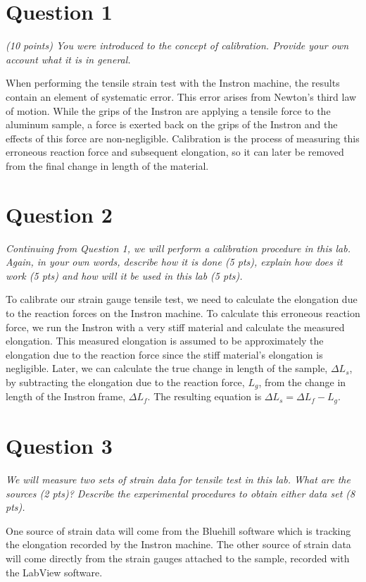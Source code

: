 \documentclass[12 pt]{article}
\begin{document}
\section*{Question 1} \label{question_1}
\textit{(10 points) You were introduced to the concept of calibration. Provide your own account what it is in general.}

When performing the tensile strain test with the Instron machine, the results contain an element of systematic error. This error arises from Newton's third law of motion. While the grips of the Instron are applying a tensile force to the aluminum sample, a force is exerted back on the grips of the Instron and the effects of this force are non-negligible. Calibration is the process of measuring this erroneous reaction force and subsequent elongation, so it can later be removed from the final change in length of the material.

\section*{Question 2} \label{question_2}
\textit{Continuing from Question 1, we will perform a calibration procedure in this lab.  Again, in your own words, describe how it is done (5 pts), explain how does it work (5 pts) and how will it be used in this lab (5 pts).}

To calibrate our strain gauge tensile test, we need to calculate the elongation due to the reaction forces on the Instron machine. To calculate this erroneous reaction force, we run the Instron with a very stiff material and calculate the measured elongation. This measured elongation is assumed to be approximately the elongation due to the reaction force since the stiff material's elongation is negligible. Later, we can calculate the true change in length of the sample, ${\Delta}L_s$, by subtracting the elongation due to the reaction force, $L_g$, from the change in length of the Instron frame, ${\Delta}L_f$. The resulting equation is ${\Delta}L_s={\Delta}L_f-L_g$.

\section*{Question 3} \label{question_3}
\textit{We will measure two sets of strain data for tensile test in this lab.  What are the sources (2 pts)? Describe the experimental procedures to obtain either data set (8 pts).}

One source of strain data will come from the Bluehill software which is tracking the elongation recorded by the Instron machine. The other source of strain data will come directly from the strain gauges attached to the sample, recorded with the LabView software.
\end{document}
